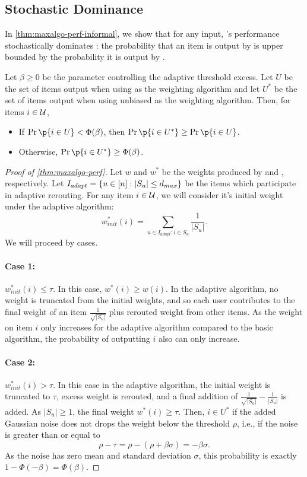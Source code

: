 \subsection{Stochastic Dominance}

In \cref{thm:maxalgo-perf-informal}, 
we show that for any input, \ouralgo{}'s performance stochastically dominates \basicalgo{}: the probability that an item is output by \basicalgo{} is upper bounded by the probability it is output by \ouralgo{}.

\begin{theorem}\label{thm:maxalgo-perf}
Let $\beta \geq 0$ be the parameter controlling the adaptive threshold excess.
Let $U$ be the set of items output when using \basicalgo{} as the weighting algorithm and let $U^*$ be the set of items output when using unbiased \ouralgo{} as the weighting algorithm.
Then, for items $i \in \mathcal{U}$,
\begin{itemize}
    \item If $\Pr\p{i \in U} < \Phi(\beta)$, then $\Pr\p{i \in U^*} \geq \Pr\p{i \in U}$.
    \item Otherwise, $\Pr\p{i \in U^*} \geq \Phi(\beta)$.
\end{itemize}
\end{theorem}

\begin{proof}[Proof of \cref{thm:maxalgo-perf}]
Let $w$ and $w^*$ be the weights produced by \basicalgo{} and \ouralgo{}, respectively.
Let $I_{adapt} = \{u \in [n] : |S_u| \leq d_{max}\}$ be the items which participate in adaptive rerouting.
For any item $i \in \mathcal{U}$, we will consider it's initial weight under the adaptive algorithm:
\[
    w^*_{init}(i) = \sum_{u \in I_{adapt}: i \in S_u} \frac{1}{|S_u|}.
\]
We will proceed by cases.
\paragraph{Case 1:} $w^*_{init}(i) \leq \tau$. In this case, $w^*(i) \geq w(i)$. In the adaptive algorithm, no weight is truncated from the initial weights, and so each user contributes to the final weight of an item $\frac{1}{\sqrt{|S_u|}}$ plus rerouted weight from other items. As the weight on item $i$ only increases for the adaptive algorithm compared to the basic algorithm, the probability of outputting $i$ also can only increase.

\paragraph{Case 2:} $w^*_{init}(i) > \tau$. In this case in the adaptive algorithm, the initial weight is truncated to $\tau$, excess weight is rerouted, and a final addition of $\frac{1}{\sqrt{|S_u|}} - \frac{1}{|S_u|}$ is added. As $|S_u| \geq 1$, the final weight $w^*(i) \geq \tau$.
Then, $i \in U^*$ if the added Gaussian noise does not drops the weight below the threshold $\rho$, i.e., if the noise is greater than or equal to 
\[
    \rho - \tau = \rho - (\rho + \beta \sigma) = -\beta \sigma.
\]
As the noise has zero mean and standard deviation $\sigma$, this probability is exactly $1 - \Phi(-\beta) = \Phi(\beta)$.
\end{proof}

